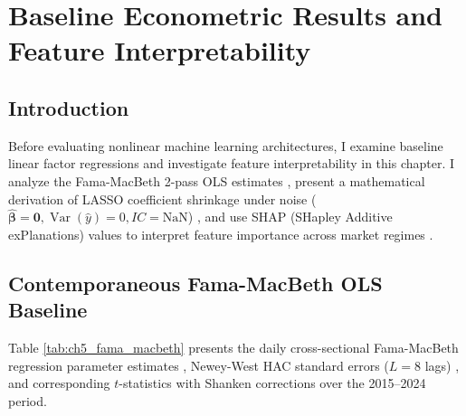 \chapter{Baseline Econometric Results and Feature Interpretability}
\label{ch:baseline_results}

\section{Introduction}
Before evaluating nonlinear machine learning architectures, I examine baseline linear factor regressions and investigate feature interpretability in this chapter. I analyze the Fama-MacBeth 2-pass OLS estimates \citep{fama1973risk, newey1987simple}, present a mathematical derivation of LASSO coefficient shrinkage under noise ($\hat{\boldsymbol{\beta}} = \mathbf{0}, \operatorname{Var}(\hat{y})=0, IC = \text{NaN}$) \citep{tibshirani1996regression, kozak2020shrinking}, and use SHAP (SHapley Additive exPlanations) values to interpret feature importance across market regimes \citep{lundberg2017unified, gu2020empirical}.

\section{Contemporaneous Fama-MacBeth OLS Baseline}
Table \ref{tab:ch5_fama_macbeth} presents the daily cross-sectional Fama-MacBeth regression parameter estimates \citep{fama1973risk}, Newey-West HAC standard errors ($L = 8$ lags) \citep{newey1987simple}, and corresponding $t$-statistics with Shanken corrections \citep{shanken1992on} over the 2015--2024 period.

\begin{table}[H]
\centering
\caption{Fama-MacBeth Daily Cross-Sectional Regression Risk Premia (2015--2024)}
\label{tab:ch5_fama_macbeth}
\end{table}

